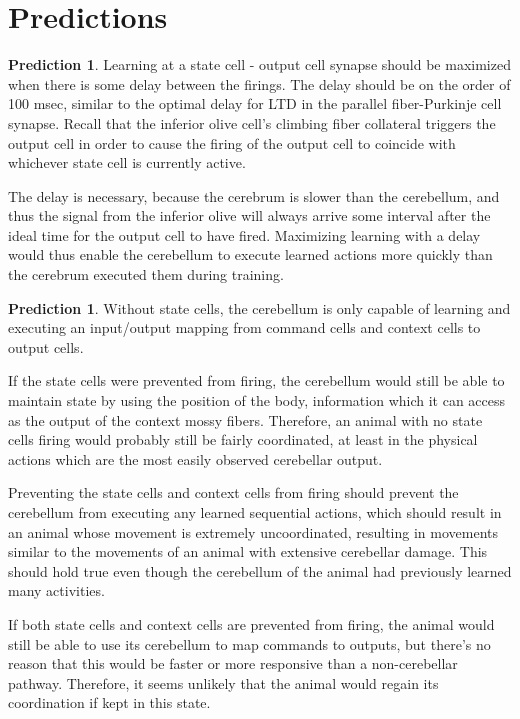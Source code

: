 \documentclass{article}
\theoremstyle{definition}
\newtheorem{pred}[thm]{Prediction}
\begin{document}
\section{Predictions}


\begin{pred}
\label{pred-positive-delay}
Learning at a state cell - output cell synapse should be maximized
when there is some delay between the firings. The delay should be on
the order of 100 msec, similar to the optimal delay for LTD in the
parallel fiber-Purkinje cell synapse. Recall that the inferior olive
cell's climbing fiber collateral triggers the output cell in order to
cause the firing of the output cell to coincide with whichever state
cell is currently active.

The delay is necessary, because the cerebrum is slower than the
cerebellum, and thus the signal from the inferior olive will always
arrive some interval after the ideal time for the output cell to have
fired. Maximizing learning with a delay would thus enable the
cerebellum to execute learned actions more quickly than the cerebrum
executed them during training.
\end{pred}

\begin{pred}
Without state cells, the cerebellum is only capable of learning and
executing an input/output mapping from command cells and context cells
to output cells. 

If the state cells were prevented from firing, the cerebellum would
still be able to maintain state by using the position of the body,
information which it can access as the output of the context mossy
fibers. Therefore, an animal with no state cells firing would probably
still be fairly coordinated, at least in the physical actions which
are the most easily observed cerebellar output.

Preventing the state cells and context cells from firing should
prevent the cerebellum from executing any learned sequential actions,
which should result in an animal whose movement is extremely
uncoordinated, resulting in movements similar to the movements of an
animal with extensive cerebellar damage. This should hold true even
though the cerebellum of the animal had previously learned many
activities.

If both state cells and context cells are prevented from firing, the
animal would still be able to use its cerebellum to map commands to
outputs, but there's no reason that this would be faster or more
responsive than a non-cerebellar pathway. Therefore, it seems unlikely
that the animal would regain its coordination if kept in this state.
\end{pred}
\end{document}
